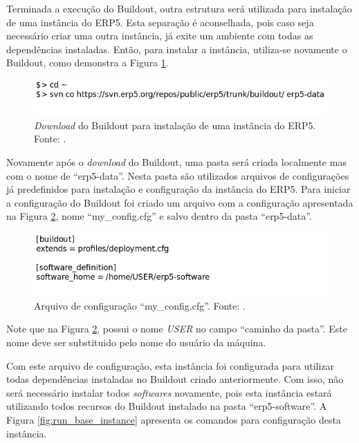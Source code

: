 Terminada a execução do Buildout, outra estrutura será utilizada para instalação de uma instância do ERP5. Esta separação é aconselhada, pois caso seja necessário criar uma outra instância, já exite um ambiente com todas as dependências instaladas. Então, para instalar a instância, utiliza-se novamente o Buildout, como demonstra a Figura \ref{fig:erp5_data}.

\begin{figure}[!ht]
\centering
\begin{center}
\includegraphics[scale=0.660,bb=50 50 600 70]{erp5_data.png}
\end{center}
\caption{\textit{Download} do Buildout para instalação de uma instância do ERP5. Fonte: \cite{erp5_buildout}.}
\label{fig:erp5_data}
\end{figure}

Novamente após o \textit{download} do Buildout, uma pasta será criada localmente mas com o nome de ``erp5-data''. Nesta pasta são utilizados arquivos de configurações já predefinidos para instalação e configuração da instância do ERP5. Para iniciar a configuração do Buildout foi criado um arquivo com a configuração apresentada na Figura \ref{fig:my_config}, nome ``my\_config.cfg'' e salvo dentro da pasta ``erp5-data''.

\begin{figure}[!ht]
\centering
\begin{center}
\includegraphics[scale=0.660,bb=0 50 400 120]{erp5_minha_instancia.png}
\end{center}
\caption{Arquivo de configuração ``my\_config.cfg''. Fonte: \cite{erp5_buildout}.}
\label{fig:my_config}
\end{figure}

Note que na Figura \ref{fig:my_config}, possui o nome \textit{USER} no campo ``caminho da pasta''. Este nome deve ser substituido pelo nome do usuário da máquina.

Com este arquivo de configuração, esta instância foi configurada para utilizar todas dependências instaladas no Buildout criado anteriormente. Com isso, não será necessário instalar todos \textit{softwares} novamente, pois esta instância estará utilizando todos recursos do Buildout instalado na pasta ``erp5-software''. A Figura \ref{fig:run_base_instance} apresenta os comandos para configuração desta instância.

